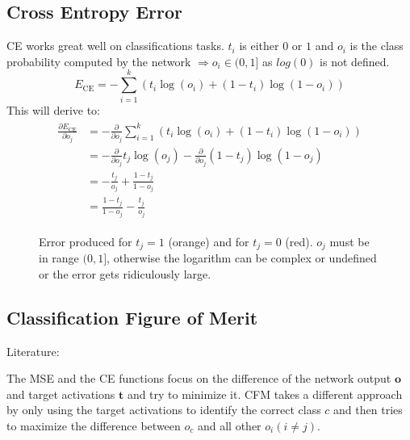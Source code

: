 \subsection{Cross Entropy Error}\label{sec:ce}
\Gls{CE} works great well on classifications tasks. $t_i$ is either $0$ or $1$ and $o_i$ is the class probability computed by the network $\Rightarrow o_i \in (0, 1]$ as $log(0)$ is not defined.
\begin{equation}\label{eq:ce}
E_{\text{CE}} = - \sum_{i=1}^k \left( t_i \log(o_i) + (1 - t_i) \log(1 - o_i) \right)
\end{equation}
This will derive to:
\begin{align}
\begin{split}
\frac{\partial E_{\text{CE}}}{\partial o_j} &= - \frac{\partial}{\partial o_j} \sum_{i=1}^k \left( t_i \log(o_i) + (1 - t_i) \log(1 - o_i) \right)\\
&= - \frac{\partial}{\partial o_j} t_j \log(o_j) - \frac{\partial}{\partial o_j} (1 - t_j) \log(1 - o_j)\\
&= - \frac{t_j}{o_j} + \frac{1 - t_j}{1 - o_j}\\
&= \frac{1 - t_j}{1 - o_j} - \frac{t_j}{o_j}
\end{split}
\end{align}

\begin{figure}
\centering
{}
\caption{Error produced for $t_j=1$ (orange) and for $t_j=0$ (red). $o_j$ must be in range $(0,1]$, otherwise the logarithm can be complex or undefined or the error gets ridiculously large.}
\end{figure}

\subsection{Classification Figure of Merit}\label{cfm}
Literature: \cite{Hampshire1990}

The \gls{MSE} and the \gls{CE} functions focus on the difference of the network output $\mathbf{o}$ and target activations $\mathbf{t}$ and try to minimize it. \Gls{CFM} takes a different approach by only using the target activations to identify the correct class $c$ and then tries to maximize the difference between $o_c$ and all other $o_i (i\neq j)$.

